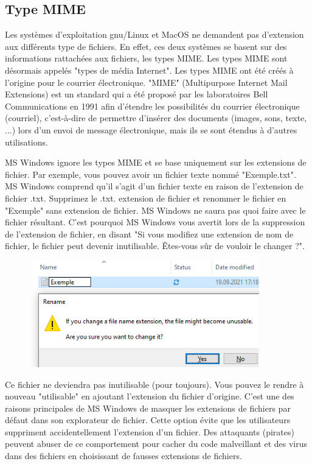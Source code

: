 \documentclass[11pt, a4paper]{book}
\begin{document}
\subsection{Type MIME}
Les systèmes d'exploitation gnu/Linux et MacOS ne demandent pas d'extension aux différents type de fichiers. En effet, ces deux systèmes se basent sur des informations rattachées aux fichiers, les types MIME. Les types MIME sont désormais appelés "types de média Internet". Les types MIME ont été créés à l’origine pour le courrier électronique. "MIME" (Multipurpose Internet Mail Extensions) est un standard qui a été proposé par les laboratoires Bell Communications en 1991 afin d'étendre les possibilités du courrier électronique (courriel), c'est-à-dire de permettre d'insérer des documents (images, sons, texte, ...) lors d'un envoi de message électronique, mais ils se sont étendus à d’autres utilisations.

MS Windows ignore les types MIME et se base uniquement sur les extensions de fichier. Par exemple, vous pouvez avoir un fichier texte nommé "Exemple.txt". MS Windows comprend qu’il s’agit d’un fichier texte en raison de l’extension de fichier .txt. Supprimez le .txt. extension de fichier et renommer le fichier en "Exemple" sans extension de fichier. MS Windows ne saura pas quoi faire avec le fichier résultant. C’est pourquoi MS Windows vous avertit lors de la suppression de l’extension de fichier, en disant "Si vous modifiez une extension de nom de fichier, le fichier peut devenir inutilisable. Êtes-vous sûr de vouloir le changer ?". 
\begin{figure}[h!]
\centering
\includegraphics[width=10cm]{images/change_extension.png}
\end{figure}

Ce fichier ne deviendra pas inutilisable (pour toujours). Vous pouvez le rendre à nouveau "utilisable" en ajoutant l’extension du fichier d’origine.
C’est une des raisons principales de MS Windows de masquer les extensions de fichiers par défaut dans son explorateur de fichier. Cette option évite que les utilisateurs suppriment accidentellement l'extension d'un fichier. Des attaquants (pirates) peuvent abuser de ce comportement pour cacher du code malveillant et des virus dans des fichiers en choisissant de fausses extensions de fichiers.
\end{document}
